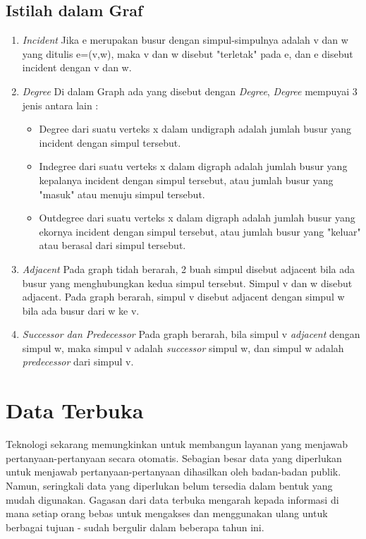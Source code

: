 \subsection{Istilah dalam Graf}
\label{sec: Istilah dalam Graf}
\begin{enumerate}
\item \textit{Incident}
Jika e merupakan busur dengan simpul-simpulnya adalah v dan w yang
ditulis e=(v,w), maka v dan w disebut "terletak" pada e, dan e disebut incident
dengan v dan w.
\item \textit{Degree}
Di dalam Graph ada yang disebut dengan \textit{Degree}, \textit{Degree} mempuyai 3 jenis antara lain :
\begin{itemize}
\item Degree dari suatu verteks x dalam undigraph adalah jumlah busur yang
incident dengan simpul tersebut.
\item Indegree dari suatu verteks x dalam digraph adalah jumlah busur yang
kepalanya incident dengan simpul tersebut, atau jumlah busur yang "masuk" atau menuju simpul tersebut.
\item Outdegree dari suatu verteks x dalam digraph adalah jumlah busur yang
ekornya incident dengan simpul tersebut, atau jumlah busur yang "keluar"
atau berasal dari simpul tersebut.
\end{itemize}
\item \textit{Adjacent}
Pada graph tidah berarah, 2 buah simpul disebut adjacent bila ada busur yang
menghubungkan kedua simpul tersebut. Simpul v dan w disebut adjacent. 
Pada graph berarah, simpul v disebut adjacent dengan simpul w bila ada busur
dari w ke v.
\item \textit{Successor dan Predecessor}
Pada graph berarah, bila simpul v \textit{adjacent} dengan simpul w, maka simpul v adalah \textit{successor} simpul w, dan simpul w adalah \textit{predecessor} dari simpul v.
\end{enumerate}

\section{Data Terbuka}
\label{sec: Data Terbuka}
Teknologi sekarang memungkinkan untuk membangun layanan yang menjawab pertanyaan-pertanyaan secara otomatis. Sebagian besar data yang diperlukan untuk menjawab pertanyaan-pertanyaan dihasilkan oleh badan-badan publik. Namun, seringkali data yang diperlukan belum tersedia dalam bentuk yang mudah digunakan. Gagasan dari data terbuka mengarah kepada informasi di mana setiap orang bebas untuk mengakses dan menggunakan ulang untuk berbagai tujuan - sudah bergulir dalam beberapa tahun ini.  	

